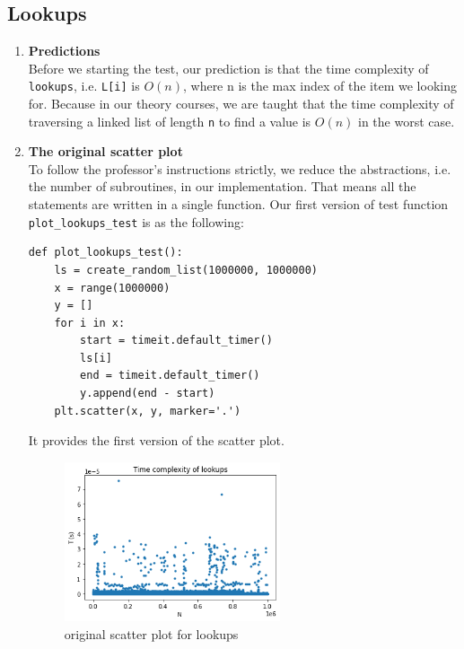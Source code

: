 \documentclass[12pt]{article}
\begin{document}
\subsection{Lookups}
\begin{enumerate}[(1)]
\item \textbf{Predictions}\\
Before we starting the test, our prediction is that the time complexity of \verb|lookups|, i.e. \verb|L[i]| is  \(O(n)\), where n is the max index of the item we looking for. Because in our theory courses, we are taught that the time complexity of traversing a linked list of length \verb|n| to find a value is \(O(n)\) in the worst case.
\item \textbf{The original scatter plot}\\
To follow the professor's instructions strictly, we reduce the abstractions, i.e. the number of subroutines, in our implementation. That means all the statements are written in a single function. Our first version of test function \verb|plot_lookups_test| is as the following:

\lstset{language=Python, basicstyle=\ttfamily\small, breaklines=true, showspaces=false,
  showstringspaces=false, breakatwhitespace=true}
\begin{lstlisting}
def plot_lookups_test():
    ls = create_random_list(1000000, 1000000)
    x = range(1000000)
    y = []
    for i in x:
        start = timeit.default_timer()
        ls[i]
        end = timeit.default_timer()
        y.append(end - start)
    plt.scatter(x, y, marker='.')
\end{lstlisting}

It provides the first version of the scatter plot.

\begin{figure}[h!]
\centering
\includegraphics[width=0.6\textwidth,height=\textheight,keepaspectratio]{figure_2.png}
\caption{original scatter plot for lookups}
\label{Figure: 2}
\end{figure}


\end{enumerate}
\end{document}
